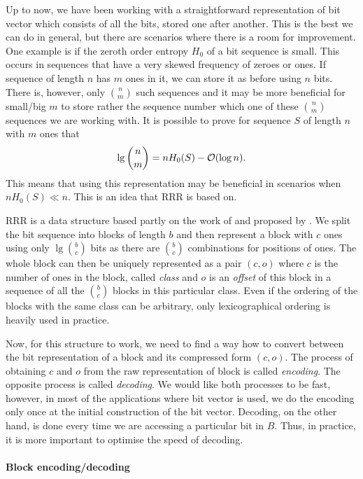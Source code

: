 Up to now, we have been working with a straightforward representation of bit vector which consists of
all the bits, stored one after another. This is the best we can do in general, but there are scenarios
where there is a room for improvement. One example is if the zeroth order entropy $H_0$ of a bit sequence
is small. This occurs in sequences that have a very skewed frequency of zeroes or ones. If sequence of
length $n$ has $m$ ones in it, we can store it as before using $n$ bits. There is, however, only ${n \choose m}$
such sequences and it may be more beneficial for small/big $m$ to store rather the sequence number which
one of these ${n \choose m}$ sequences we are working with. It is possible to prove for sequence $S$ of
length $n$ with $m$ ones that $$\mathop{\mathrm{lg}} {n \choose m} = nH_0(S)-\mathcal{O}(\log n).$$ This means that using this
representation may be beneficial in scenarios when $nH_0(S)\ll n$. This is an idea that RRR is based on.

RRR is a data structure based partly on the work of \cite{pagh2001low} and proposed by \cite{raman2007succinct}.
We split the bit sequence into blocks of length $b$ and then represent a block with $c$ ones using only
$\lg {b \choose c}$ bits as there are ${b \choose c}$ combinations for positions of ones. The whole block
can then be uniquely represented as a pair $(c, o)$ where $c$ is the number of ones in the block, called
\emph{class} and $o$ is an \emph{offset} of this block in a sequence of all the ${b \choose c}$ blocks in
this particular class. Even if the ordering of the blocks with the same class can be arbitrary, only
lexicographical ordering is heavily used in practice.

Now, for this structure to work, we need to find a way how to convert between the bit representation of
a block and its compressed form $(c, o)$. The process of obtaining $c$ and $o$ from the raw representation
of block is called \textit{encoding}. The opposite process is called \textit{decoding}. We would like both
processes to be fast, however, in most of the applications where bit vector is used, we do the encoding only
once at the initial construction of the bit vector. Decoding, on the other hand, is done every time we are
accessing a particular bit in $B$. Thus, in practice, it is more important to optimise the speed of decoding.

\paragraph{Block encoding/decoding}

